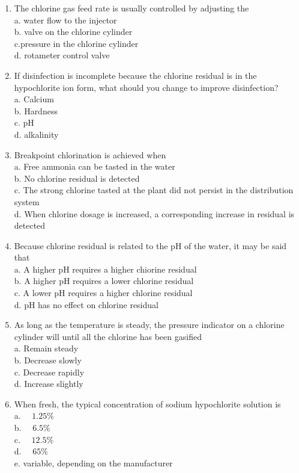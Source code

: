 \begin{enumerate}
\item The chlorine gas feed rate is usually controlled by adjusting the\\
a. water flow to the injector\\
b. valve on the chlorine cylinder\\
c.pressure in the chlorine cylinder\\
d. rotameter control valve\\
\item If disinfection is incomplete because the chlorine residual is in the hypochlorite ion form, what should you change to improve disinfection?\\
a. Calcium\\
b. Hardness\\
c. pH\\
d. alkalinity\\
\item Breakpoint chlorination is achieved when\\
a. Free ammonia can be tasted in the water\\
b. No chlorine residual is detected\\
c. The strong chlorine tasted at the plant did not persist in the distribution system\\
d. When chlorine dosage is increased, a corresponding increase in residual is detected\\

\item Because chlorine residual is related to the $\mathrm{pH}$ of the water, it may be said that\\
a. A higher $\mathrm{pH}$ requires a higher chiorine residual\\
b. A higher $\mathrm{pH}$ requires a lower chlorine residual\\
c. A lower pH requires a higher chlorine residual\\
d. pH  has no effect on chlorine residual\\


  \item As long as the temperature is steady, the pressure indicator on a chlorine cylinder will until all the chlorine has been gasified\\
a. Remain steady\\
b. Decrease slowly\\
c. Decrease rapidly\\
d. Increase slightly\\

\item When fresh, the typical concentration of sodium hypochlorite solution is\\
a. $\quad 1.25 \%$\\
b. $\quad 6.5 \%$\\
c. $\quad 12.5 \%$\\
d. $\quad 65 \%$\\
e. variable, depending on the manufacturer\\


\end{enumerate}
